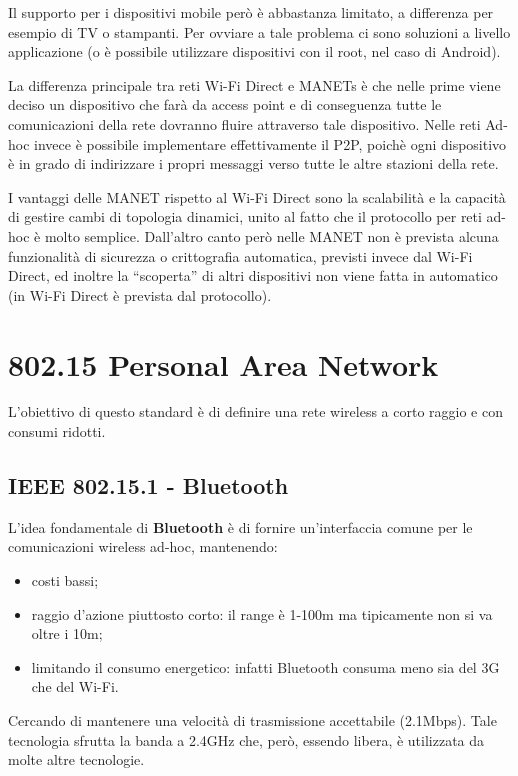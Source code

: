 Il supporto per i dispositivi mobile però è abbastanza limitato, a differenza per
esempio di TV o stampanti. Per ovviare a tale problema ci sono soluzioni a
livello applicazione (o è possibile utilizzare dispositivi con il root, nel caso
di Android).

La differenza principale tra reti Wi-Fi Direct e MANETs è che nelle prime
viene deciso un dispositivo che farà da access point e di conseguenza tutte le
comunicazioni della rete dovranno fluire attraverso tale dispositivo. Nelle reti
Ad-hoc invece è possibile implementare effettivamente il P2P, poichè ogni
dispositivo è in grado di indirizzare i propri messaggi verso tutte le altre
stazioni della rete.

I vantaggi delle MANET rispetto al Wi-Fi Direct sono la scalabilità e la
capacità di gestire cambi di topologia dinamici, unito al fatto che il
protocollo per reti ad-hoc è molto semplice. Dall'altro canto però nelle MANET
non è prevista alcuna funzionalità di sicurezza o crittografia automatica,
previsti invece dal Wi-Fi Direct, ed inoltre la ``scoperta'' di altri dispositivi
non viene fatta in automatico (in Wi-Fi Direct è prevista dal protocollo).

\section{802.15 Personal Area Network}\label{personal-area-network}

L'obiettivo di questo standard è di definire una rete wireless a corto
raggio e con consumi ridotti.

\subsection{IEEE 802.15.1 - Bluetooth}
L'idea fondamentale di \textbf{Bluetooth} è di fornire un'interfaccia comune per
le comunicazioni wireless ad-hoc, mantenendo:
\begin{itemize}
  \item costi bassi;
  \item raggio d'azione piuttosto corto: il range è 1-100m ma tipicamente non si
        va oltre i 10m;
  \item limitando il consumo energetico: infatti Bluetooth consuma meno sia del
        3G che del Wi-Fi.
\end{itemize}
Cercando di mantenere una velocità di trasmissione accettabile (2.1Mbps).
Tale tecnologia sfrutta la banda a 2.4GHz che, però, essendo libera, è
utilizzata da molte altre tecnologie.

